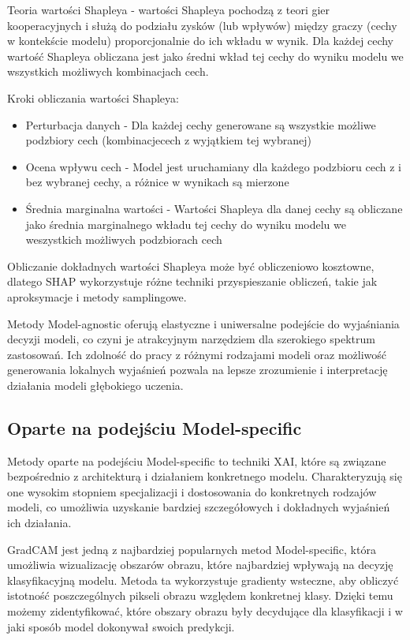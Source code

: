 Teoria wartości Shapleya - wartości Shapleya pochodzą z teori gier kooperacyjnych i służą do podziału zysków (lub wpływów) między graczy (cechy w kontekście modelu) proporcjonalnie do ich wkładu w wynik.
Dla każdej cechy wartość Shapleya obliczana jest jako średni wkład tej cechy do wyniku modelu we wszystkich możliwych kombinacjach cech.

Kroki obliczania wartości Shapleya:
\begin{itemize}
	\item Perturbacja danych - Dla każdej cechy generowane są wszystkie możliwe podzbiory cech (kombinacjecech z wyjątkiem tej wybranej)
	\item Ocena wpływu cech - Model jest uruchamiany dla każdego podzbioru cech z i bez wybranej cechy, a różnice w wynikach są mierzone
	\item Średnia marginalna wartości - Wartości Shapleya dla danej cechy są obliczane jako średnia marginalnego wkładu tej cechy do wyniku modelu we weszystkich możliwych podzbiorach cech
\end{itemize}

Obliczanie dokładnych wartości Shapleya może być obliczeniowo kosztowne, dlatego SHAP wykorzystuje różne techniki przyspieszanie obliczeń, takie jak aproksymacje i metody samplingowe.

\vspace{1cm}
Metody Model-agnostic oferują elastyczne i uniwersalne podejście do wyjaśniania decyzji modeli, co czyni je atrakcyjnym narzędziem dla szerokiego spektrum zastosowań. Ich zdolność do pracy z różnymi rodzajami modeli oraz możliwość generowania lokalnych wyjaśnień pozwala na lepsze zrozumienie i interpretację działania modeli głębokiego uczenia.

\subsection*{Oparte na podejściu Model-specific}
Metody oparte na podejściu Model-specific to techniki XAI, które są związane bezpośrednio z architekturą i działaniem konkretnego modelu. Charakteryzują się one wysokim stopniem specjalizacji i dostosowania do konkretnych rodzajów modeli, co umożliwia uzyskanie bardziej szczegółowych i dokładnych wyjaśnień ich działania.

GradCAM jest jedną z najbardziej popularnych metod Model-specific, która umożliwia wizualizację obszarów obrazu, które najbardziej wpływają na decyzję klasyfikacyjną modelu. Metoda ta wykorzystuje gradienty wsteczne, aby obliczyć istotność poszczególnych pikseli obrazu względem konkretnej klasy. Dzięki temu możemy zidentyfikować, które obszary obrazu były decydujące dla klasyfikacji i w jaki sposób model dokonywał swoich predykcji.

